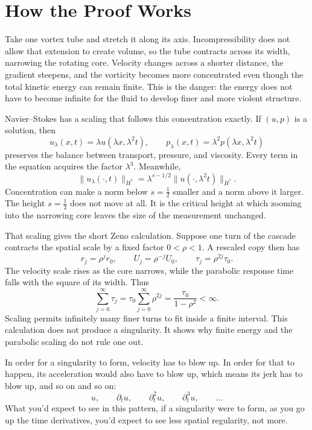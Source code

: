 \section*{How the Proof Works}

Take one vortex tube and stretch it along its axis. Incompressibility does not
allow that extension to create volume, so the tube contracts across its width,
narrowing the rotating core. Velocity changes across a shorter distance, the
gradient steepens, and the vorticity becomes more concentrated even though the
total kinetic energy can remain finite. This is the danger: the energy does not
have to become infinite for the fluid to develop finer and more violent
structure.

Navier--Stokes has a scaling that follows this concentration exactly. If
\((u,p)\) is a solution, then
\[
u_\lambda(x,t)=\lambda u(\lambda x,\lambda^2t),
\qquad
p_\lambda(x,t)=\lambda^2p(\lambda x,\lambda^2t)
\]
preserves the balance between transport, pressure, and viscosity. Every term in
the equation acquires the factor \(\lambda^3\). Meanwhile,
\[
\|u_\lambda(\cdot,t)\|_{\dot H^s}
=\lambda^{s-1/2}
  \|u(\cdot,\lambda^2t)\|_{\dot H^s}.
\]
Concentration can make a norm below \(s=\tfrac12\) smaller and a norm above it
larger. The height \(s=\tfrac12\) does not move at all. It is the critical
height at which zooming into the narrowing core leaves the size of the
measurement unchanged.

That scaling gives the short Zeno calculation. Suppose one turn of the cascade
contracts the spatial scale by a fixed factor \(0<\rho<1\). A rescaled copy then
has
\[
r_j=\rho^j r_0,
\qquad
U_j=\rho^{-j}U_0,
\qquad
\tau_j=\rho^{2j}\tau_0.
\]
The velocity scale rises as the core narrows, while the parabolic response time
falls with the square of its width. Thus
\[
\sum_{j=0}^{\infty}\tau_j
=\tau_0\sum_{j=0}^{\infty}\rho^{2j}
=\frac{\tau_0}{1-\rho^2}<\infty.
\]
Scaling permits infinitely many finer turns to fit inside a finite interval.
This calculation does not produce a singularity. It shows why finite energy
and the parabolic scaling do not rule one out.

In order for a singularity to form, velocity has to blow up. In order for that
to happen, its acceleration would also have to blow up, which means its jerk
has to blow up, and so on and so on:
\[
u,\qquad
\partial_tu,\qquad
\partial_t^2u,\qquad
\partial_t^3u,\qquad\ldots
\]
What you'd expect to see in this pattern, if a singularity were to form, as
you go up the time derivatives, you'd expect to see less spatial regularity,
not more.


